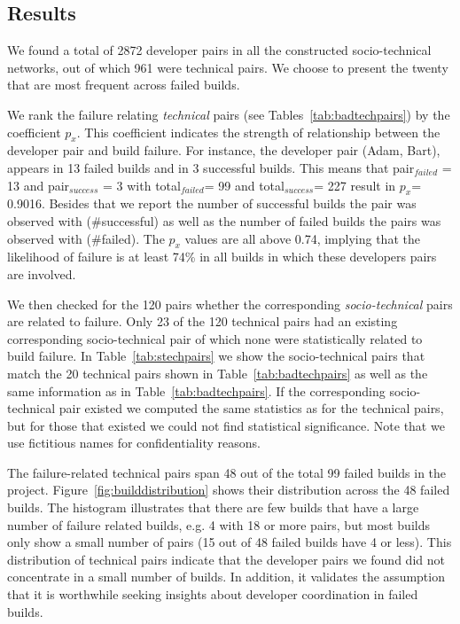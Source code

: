 \documentclass[12pt,oneside]{book}
\begin{document}
\subsection{Results}
We found a total of 2872 developer pairs in all the constructed
socio-technical networks, out of which 961 were technical pairs. %
We choose to present the twenty that are most frequent across failed builds.

We rank the failure relating \emph{technical} pairs (see Tables~\ref{tab:badtechpairs})
by the coefficient $p_{x}$. This coefficient indicates the strength of
relationship between the developer pair and build failure. For instance, the
developer pair (Adam, Bart), appears in 13 failed builds and in 3
successful builds. This means that pair$_{failed}$ = 13 and pair$_{success}$ = 3
with total$_{failed}$= 99 and total$_{success}$= 227 result in $p_x$= 0.9016.
Besides that we report the number of successful builds the pair was observed with
(\#successful) as well as the number of failed builds the pairs was observed with
(\#failed). The $p_x$ values are all above 0.74, implying that the likelihood
of failure is at least 74\% in all builds in which these developers pairs are
involved. 

We then checked for the 120 pairs whether the corresponding \emph{socio-technical} pairs are related to failure.
Only 23 of the 120 technical pairs had an existing corresponding socio-technical pair of which none were statistically related to build failure. 
In Table~\ref{tab:stechpairs} we show the socio-technical pairs that match the 20 technical pairs shown in Table~\ref{tab:badtechpairs} as well as the same information as in Table~\ref{tab:badtechpairs}.
If the corresponding socio-technical pair existed we computed the same statistics as for the technical pairs, but for those that existed we could not find statistical significance.
Note that we use fictitious names for confidentiality reasons.

The failure-related technical pairs span 48 out of the total 99 failed builds in
the project. Figure~\ref{fig:builddistribution} shows their distribution
 across the 48 failed builds. The histogram
illustrates that there are few builds that have a large number of failure related
builds, e.g. 4 with 18 or more pairs, but most builds only show a small number of
pairs (15 out of 48 failed builds have 4 or less). 
This distribution of technical pairs indicate that the developer
pairs we found  did not concentrate in a small number of builds. 
In addition, it validates the assumption that it is
worthwhile seeking insights about developer coordination in failed builds.
\end{document}
